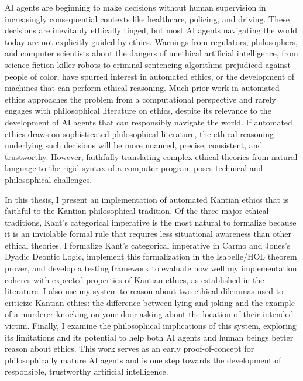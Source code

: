 %
\begin{isabellebody}%
%
%
\isadelimtheory
%
\endisadelimtheory
%
\isatagtheory
%
\endisatagtheory
{\isafoldtheory}%
%
\isadelimtheory
%
\endisadelimtheory
%
\begin{isamarkuptext}%
AI agents are beginning to make decisions without human supervision in increasingly consequential 
contexts like healthcare, policing, and driving. These decisions are inevitably ethically tinged, 
but most AI agents navigating the world today are not explicitly guided by ethics.
Warnings from regulators, philosophers, and computer scientists about the 
dangers of unethical artificial intelligence, from science-fiction killer robots to criminal
sentencing algorithms prejudiced against people of color, have spurred interest in automated ethics, or the development 
of machines that can perform ethical reasoning. Much prior work in automated ethics approaches the 
problem from a computational perspective and rarely engages with philosophical literature on ethics, despite
its relevance to the development of AI agents that can
responsibly navigate the world. If automated ethics draws on sophisticated philosophical literature, the ethical reasoning
underlying such decisions will be more nuanced, precise, consistent, and trustworthy. However, faithfully translating complex ethical theories
from natural language to the rigid syntax of a computer program poses technical and philosophical 
challenges. 

In this thesis, I present an implementation of automated Kantian
ethics that is faithful to the Kantian philosophical tradition. Of the three major ethical
traditions, Kant's categorical imperative is the most natural to formalize because it is an inviolable 
formal rule that requires less situational awareness than other ethical theories. I formalize Kant's categorical imperative 
in Carmo and Jones's Dyadic Deontic Logic, implement this formalization 
in the Isabelle/HOL theorem prover, and develop a testing framework to evaluate how well 
my implementation coheres with expected properties of Kantian ethics, as established in the literature. 
I also use my system to reason about two ethical dilemmas used to criticize Kantian ethics: the difference
between lying and joking and the example of a murderer knocking on your door asking about the location of their
intended victim. Finally, I examine the philosophical implications of this system, exploring its limitations 
and its potential to help both AI agents and human beings better reason about ethics. This work serves 
as an early proof-of-concept for philosophically mature AI agents and is one step towards the development 
of responsible, trustworthy artificial intelligence.%
\end{isamarkuptext}\isamarkuptrue%
%
\isadelimtheory
%
\endisadelimtheory
%
\isatagtheory
%
\endisatagtheory
{\isafoldtheory}%
%
\isadelimtheory
%
\endisadelimtheory
%
\end{isabellebody}%
